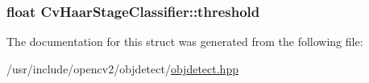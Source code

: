 \hypertarget{structCvHaarStageClassifier_ae0403def5cc2c27348b0353bbfab3da6}{
\subsubsection[{threshold}]{\setlength{\rightskip}{0pt plus 5cm}float Cv\-Haar\-Stage\-Classifier\-::threshold}}\label{structCvHaarStageClassifier_ae0403def5cc2c27348b0353bbfab3da6}


The documentation for this struct was generated from the following file\-:\begin{DoxyCompactItemize}
\item 
/usr/include/opencv2/objdetect/\hyperlink{objdetect_8hpp}{objdetect.\-hpp}\end{DoxyCompactItemize}
